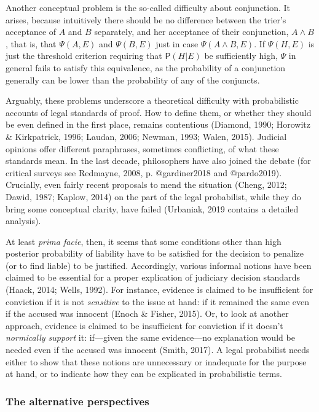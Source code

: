 \documentclass[11pt,dvipsnames,enabledeprecatedfontcommands]{scrartcl}
\newcommand{\pr}[1]{\mathsf{P}(#1)}
\begin{document}
Another conceptual problem is the so-called difficulty about
conjunction. It arises, because intuitively there should be no
difference between the trier's acceptance of \(A\) and \(B\) separately,
and her acceptance of their conjunction, \(A\wedge B\), that is, that
\(\Psi(A,E)\) and \(\Psi(B,E)\) just in case \(\Psi(A\wedge B, E)\). If
\(\Psi(H,E)\) is just the threshold criterion requiring that
\(\pr{H\vert E}\) be sufficiently high, \(\Psi\) in general fails to
satisfy this equivalence, as the probability of a conjunction generally
can be lower than the probability of any of the conjuncts.

Arguably, these problems underscore a theoretical difficulty with
probabilistic accounts of legal standards of proof. How to define them,
or whether they should be even defined in the first place, remains
contentious (Diamond, 1990; Horowitz \& Kirkpatrick, 1996; Laudan, 2006;
Newman, 1993; Walen, 2015). Judicial opinions offer different
paraphrases, sometimes conflicting, of what these standards mean. In the
last decade, philosophers have also joined the debate (for critical
surveys see Redmayne, 2008, p. @gardiner2018 and @pardo2019). Crucially,
even fairly recent proposals to mend the situation (Cheng, 2012; Dawid,
1987; Kaplow, 2014) on the part of the legal probabilist, while they do
bring some conceptual clarity, have failed (Urbaniak, 2019 contains a
detailed analysis).

At least \emph{prima facie}, then, it seems that some conditions other
than high posterior probability of liability have to be satisfied for
the decision to penalize (or to find liable) to be justified.
Accordingly, various informal notions have been claimed to be essential
for a proper explication of judiciary decision standards (Haack, 2014;
Wells, 1992). For instance, evidence is claimed to be insufficient for
conviction if it is not \emph{sensitive} to the issue at hand: if it
remained the same even if the accused was innocent (Enoch \& Fisher,
2015). Or, to look at another approach, evidence is claimed to be
insufficient for conviction if it doesn't \emph{normically support} it:
if---given the same evidence---no explanation would be needed even if
the accused was innocent (Smith, 2017). A legal probabilist needs either
to show that these notions are unnecessary or inadequate for the purpose
at hand, or to indicate how they can be explicated in probabilistic
terms.

\hypertarget{the-alternative-perspectives}{%
\subsubsection{The alternative
perspectives}\label{the-alternative-perspectives}}
\end{document}
